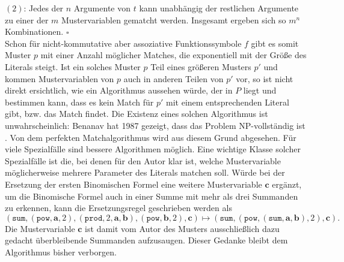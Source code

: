 $(2)$: Jedes der $n$ Argumente von $t$ kann unabhängig der restlichen Argumente zu einer der $m$ Mustervariablen gematcht werden. Insgesamt ergeben sich so $m^n$ Kombinationen.
\hfill $\square$\\

Schon für nicht-kommutative aber assoziative Funktionssymbole $f$ gibt es somit Muster $p$ mit einer Anzahl möglicher Matches, die exponentiell mit der Größe des Literals steigt. Ist ein solches Muster $p$ Teil eines größeren Musters $p'$ und kommen Mustervariablen von $p$ auch in anderen Teilen von $p'$ vor, so ist nicht direkt ersichtlich, wie ein Algorithmus aussehen würde, der in $P$ liegt und bestimmen kann, dass es kein Match für $p'$ mit einem entsprechenden Literal gibt, bzw. das Match findet. Die Existenz eines solchen Algorithmus ist unwahrscheinlich: Benanav hat 1987 gezeigt, dass das Problem NP-vollständig ist \cite{NPHardMatching}.
Von dem perfekten Matchalgorithmus wird aus diesem Grund abgesehen. Für viele Spezialfälle sind bessere Algorithmen möglich. Eine wichtige Klasse solcher Spezialfälle ist die, bei denen für den Autor klar ist, welche Mustervariable möglicherweise mehrere Parameter des Literals matchen soll. Würde bei der Ersetzung der ersten Binomischen Formel eine weitere Mustervariable $\mathbf c$ ergänzt, um die Binomische Formel auch in einer Summe mit mehr als drei Summanden zu erkennen, kann die Ersetzungsregel geschrieben werden als
$$(\texttt{sum}, (\texttt{pow}, \mathbf a, 2), (\texttt{prod}, 2, \mathbf a, \mathbf b), (\texttt{pow}, \mathbf b, 2), \mathbf c) \mapsto (\texttt{sum}, (\texttt{pow}, (\texttt{sum}, \mathbf a, \mathbf b), 2), \mathbf c).$$
Die Mustervariable $\mathbf c$ ist damit vom Autor des Musters ausschließlich dazu gedacht überbleibende Summanden \glqq aufzusaugen\grqq{}. Dieser Gedanke bleibt dem Algorithmus bisher verborgen.
